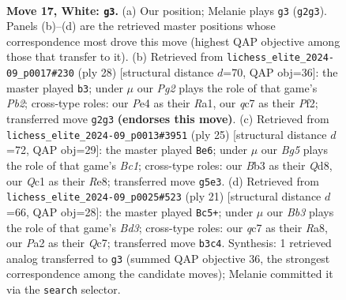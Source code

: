 \documentclass[11pt]{article}
\begin{document}
\clearpage

\begin{figure}[p]\centering
\begin{subfigure}{0.46\textwidth}\centering
\resizebox{\linewidth}{!}{%
\newchessgame
\chessboard[
  setfen={r3r1k1/1bqn1pbp/p5p1/1ppPp1B1/4P3/1BP4N/P4PPP/R1Q1K2R w - - 2 17},
  showmover=false,
  pgfstyle=straightmove, color=movearrow, markmove={g2-g3}
]}
\caption{}
\end{subfigure}\hfill
\begin{subfigure}{0.46\textwidth}\centering
\resizebox{\linewidth}{!}{%
\newchessgame
\chessboard[
  setfen={r1b2rk1/2pnqppp/3p4/p1p1p3/P1P1P1P1/3PBN1P/1P3P2/R2QK2R w KQ - 1 15},
  showmover=false,
  pgfstyle=straightmove, color=movearrow, markmove={b2-b3}
]}
\caption{}
\end{subfigure}
\\[4pt]
\begin{subfigure}{0.46\textwidth}\centering
\resizebox{\linewidth}{!}{%
\newchessgame
\chessboard[
  setfen={r1bqr1k1/pp2bpp1/2p2np1/3p4/3P1B2/2NBP2P/PPQ2PP1/R4RK1 b - - 1 13},
  showmover=false,
  pgfstyle=straightmove, color=movearrow, markmove={c8-e6}
]}
\caption{}
\end{subfigure}\hfill
\begin{subfigure}{0.46\textwidth}\centering
\resizebox{\linewidth}{!}{%
\newchessgame
\chessboard[
  setfen={r1b1k2r/1pq2ppp/p1pb1n2/4pP2/4P3/3B3P/PPP1Q1P1/RNB2RK1 b kq - 0 11},
  showmover=false,
  pgfstyle=straightmove, color=movearrow, markmove={d6-c5}
]}
\caption{}
\end{subfigure}
\caption{\textbf{Move 17, White: \texttt{g3}.} (a) Our position; Melanie plays \texttt{g3} (\texttt{g2g3}). Panels (b)--(d) are the retrieved master positions whose correspondence most drove this move (highest QAP objective among those that transfer to it). (b) Retrieved from \texttt{lichess\_elite\_2024-09\_p0017\#230} (ply 28) [structural distance $d$=70, QAP obj=36]: the master played \texttt{b3}; under $\mu$ our \emph{Pg2} plays the role of that game's \emph{Pb2}; cross-type roles: our \emph{P}e4 as their \emph{R}a1, our \emph{q}c7 as their \emph{P}f2; transferred move \texttt{g2g3} \textbf{(endorses this move)}. (c) Retrieved from \texttt{lichess\_elite\_2024-09\_p0013\#3951} (ply 25) [structural distance $d$=72, QAP obj=29]: the master played \texttt{Be6}; under $\mu$ our \emph{Bg5} plays the role of that game's \emph{Bc1}; cross-type roles: our \emph{B}b3 as their \emph{Q}d8, our \emph{Q}c1 as their \emph{R}e8; transferred move \texttt{g5e3}. (d) Retrieved from \texttt{lichess\_elite\_2024-09\_p0025\#523} (ply 21) [structural distance $d$=66, QAP obj=28]: the master played \texttt{Bc5+}; under $\mu$ our \emph{Bb3} plays the role of that game's \emph{Bd3}; cross-type roles: our \emph{q}c7 as their \emph{R}a8, our \emph{P}a2 as their \emph{Q}c7; transferred move \texttt{b3c4}. Synthesis: 1 retrieved analog transferred to \texttt{g3} (summed QAP objective 36, the strongest correspondence among the candidate moves); Melanie committed it via the \texttt{search} selector.}
\label{fig:thought-m32}
\end{figure}
\end{document}
